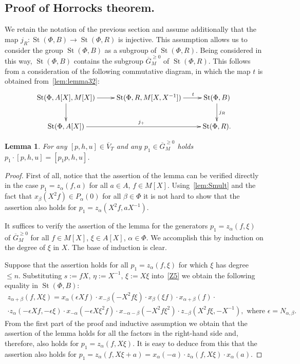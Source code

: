 \documentclass[oneside, 8pt]{amsart}
\newtheorem{lemma}{Lemma}
\theoremstyle{remark}
\theoremstyle{definition}
\numberwithin{lemma}{section}
\numberwithin{prop}{section}
\numberwithin{corollary}{section}
\numberwithin{externaltheorem}{section}
\DeclareMathOperator{\St}{St}
\newcommand{\inv}{^{-1}}
\numberwithin{equation}{section}
\begin{document}
\subsection{Proof of Horrocks theorem.} \label{sec:P1glueing}
We retain the notation of the previous section and assume additionally that the map $j_R \colon \St(\Phi, B) \to \St(\Phi, R)$ is injective.
This assumption allows us to consider the group $\St(\Phi, B)$ as a subgroup of $\St(\Phi, R)$.
Being considered in this way, $\St(\Phi, B)$ contains the subgroup $\overline{G}^{\geq 0}_M$ of $\St(\Phi, R)$.
This follows from a consideration of the following commutative diagram, in which the map $t$ is obtained from~\cref{lem:lemma32}:
\[ \xymatrix{ \St(\Phi, A[X], M[X]) \ar[d] \ar[r] & \St(\Phi, R, M[X, X\inv]) \ar[r]^(.65){t} & \St(\Phi, B) \ar[d]^{j_R} \\
   \St(\Phi, A[X]) \ar[rr]^{j_+} & & \St(\Phi, R). } \]

\begin{lemma}\label{lem:action} For any $[p, h, u]\in \overline{V}_T$ and any $p_1 \in \overline{G}^{\geq 0}_M$ holds $p_1 \cdot [p, h, u] = [p_1p, h, u]$. \end{lemma}
\begin{proof} First of all, notice that the assertion of the lemma can be verified directly in the case $p_1 = z_\alpha(f, a)$ for all $a\in A$, $f\in M[X]$. Using~\cref{lem:Smult} and the fact that $x_\beta(X^2f) \in P_\alpha(0)$ for all $\beta \in \Phi$ it is not hard to show that the assertion also holds for $p_1 = z_\alpha(X^2f, aX^{-1})$.

It suffices to verify the assertion of the lemma for the generators $p_1 = z_\alpha(f, \xi)$ of $\overline{G}_M^{\geq 0}$ for all $f \in M[X]$, $\xi\in A[X]$, $\alpha \in \Phi$. We accomplish this by 
induction on the degree of $\xi$ in $X$. The base of induction is clear.

Suppose that the assertion holds for all $p_1 = z_\alpha(f, \xi)$ for which $\xi$ has degree $\leq n$.
Substituting $s := fX$, $\eta := X^{-1}$, $\xi := X\xi$ into~\eqref{Z5} we obtain the following equality in $\St(\Phi, B)$:
\begin{multline*}
 z_{\alpha+\beta}(f, X\xi) = x_\alpha(\epsilon Xf) \cdot x_{-\beta}(-X^2 f\xi ) \cdot x_{\beta}(\xi f) \cdot x_{\alpha+\beta}(f) \cdot \\ \cdot z_\alpha(-\epsilon Xf, -\epsilon \xi) \cdot x_{-\alpha}(-\epsilon X\xi^2f) \cdot x_{-\alpha-\beta}(- X^2f \xi^2) \cdot z_{-\beta}(X^2f\xi, -X^{-1}),\text{ where $\epsilon = N_{\alpha, \beta}$.}
\end{multline*}
From the first part of the proof and inductive assumption we obtain that the assertion of the lemma holds for all the factors in the right-hand side and, therefore, also holds  for $p_1 = z_\alpha(f, X\xi)$. It is easy to deduce from this that the assertion also holds for $p_1 = z_\alpha(f, X\xi + a) = x_\alpha(-a) \cdot z_\alpha(f, X\xi) \cdot x_\alpha(a)$. 
\end{proof}
\end{document}
